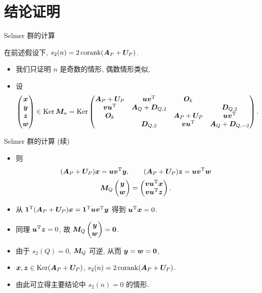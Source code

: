 \documentclass[aspectratio=169,handout]{ctexbeamer}
\begin{document}
\section{结论证明}
\begin{frame}{Selmer 群的计算}
  \onslide<+->
  \begin{lemma}
    在前述假设下, $s_2(n)=2\corank(\bfA_P+\bfU_P)$.
  \end{lemma}
  \onslide<+->
  \begin{itemize}
    \item 我们只证明 $n$ 是奇数的情形, 偶数情形类似,
    \item 设
    \[
      \begin{pmatrix}
        \bfx\\\bfy\\\bfz\\\bfw
      \end{pmatrix}\in\Ker\bfM_n
      =\Ker\begin{pmatrix}
        \bfA_P+\bfU_P&\bfu\bfv^\rmT&\bfO_k&\\
        \bfv\bfu^\rmT&\bfA_Q+\bfD_{Q,2}&&\bfD_{Q,2}\\
        \bfO_k&&\bfA_P+\bfU_P&\bfu\bfv^\rmT\\
        &\bfD_{Q,2}&\bfv\bfu^\rmT&\bfA_Q+\bfD_{Q,-2}
      \end{pmatrix}.
    \]
  \end{itemize}
\end{frame}
  

\begin{frame}{Selmer 群的计算 (续)}
  \begin{itemize}
    \item 
    则
    \[
      (\bfA_P+\bfU_P)\bfx=\bfu\bfv^\rmT\bfy,\qquad
      (\bfA_P+\bfU_P)\bfz=\bfu\bfv^\rmT\bfw
    \]
    \[
      \bfM_Q\begin{pmatrix}
        \bfy\\\bfw
      \end{pmatrix}
      =\begin{pmatrix}
        \bfv\bfu^\rmT\bfx\\
        \bfv\bfu^\rmT\bfz
      \end{pmatrix}.
    \]
    \item 从 ${\bf1}^\rmT(\bfA_P+\bfU_P)\bfx={\bf1}^\rmT\bfu\bfv^\rmT\bfy$ 得到 $\bfu^\rmT\bfx=0$.
    \item 同理 $\bfu^\rmT\bfz=0$, 故 $\bfM_Q\begin{pmatrix}
        \bfy\\\bfw
      \end{pmatrix}={\bf0}$.
    \item 由于 $s_2(Q)=0$, $\bfM_Q$ 可逆, 从而 $\bfy=\bfw={\bf0}$,
    \item $\bfx,\bfz\in\Ker(\bfA_P+\bfU_P)$, $s_2(n)=2\corank(\bfA_P+\bfU_P)$.
    \item 由此可立得主要结论中 $s_2(n)=0$ 的情形.
  \end{itemize}
\end{frame}
\end{document}
